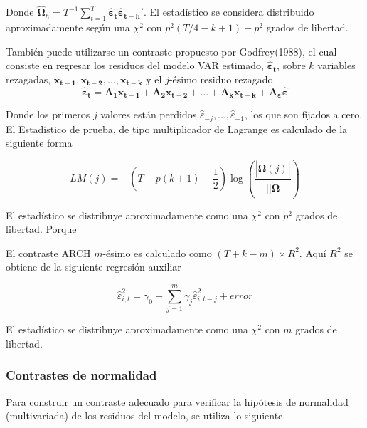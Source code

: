 \documentclass[12pt, twoside]{book}\usepackage[]{graphicx}\usepackage[]{color}
\numberwithin{equation}{section}
\numberwithin{theorem}{section}
\numberwithin{teorema}{section}
\numberwithin{defi}{section}
\numberwithin{prop}{section}
\numberwithin{defi}{section}
\theoremstyle{plain}
\begin{document}
Donde  $ \boldsymbol{\hat{\Omega}}_{h} = T^{-1}\sum_{t=1}^{T}\boldsymbol{\hat{\varepsilon}_{t}\hat{\varepsilon}_{t-h}'}$. El estadístico se considera distribuido aproximadamente según una $\chi^{2}$ con $p^{2}(T/4-k+1)-p^{2}$ grados de libertad. 

También puede utilizarse un contraste propuesto por Godfrey(1988),  el cual consiste en regresar los residuos del modelo VAR estimado, $\boldsymbol{\hat{\varepsilon}_{t}}$, sobre $k$ variables rezagadas, $\mathbf{x_{t-1}, x_{t-2}, ...,x_{t-k}}$ y el $j$-ésimo residuo rezagado
\begin{equation}
\boldsymbol{\hat{\varepsilon}_{t}}=\mathbf{A_{1}x_{t-1}+A_{2}x_{t-2}+...+A_{k}x_{t-k}+A_{\varepsilon}}\boldsymbol{\hat{\varepsilon}}
\end{equation}

Donde los primeros $j$ valores están perdidos $\hat{\varepsilon}_{-j},...,\hat{\varepsilon}_{-1}$, los que son fijados a cero. El Estadístico de prueba, de tipo multiplicador de Lagrange es calculado de la siguiente forma 

\begin{equation}
LM(j) = -(T-p(k+1)-\frac{1}{2})\log \left(\frac{|\boldsymbol{\tilde{\Omega}}(j)|}{||\boldsymbol{\tilde{\Omega}}}\right)
\end{equation}

El estadístico se distribuye aproximadamente como una $\chi^{2}$ con $p^{2}$ grados de libertad. Porque 


El contraste ARCH $m$-ésimo es calculado como $(T+k-m)\times R^{2}$. Aquí $R^{2}$ se obtiene de la siguiente regresión auxiliar

\begin{equation}
\hat{\varepsilon}^{2}_{i,t} = \gamma_{0}+\sum_{j=1}^{m}\gamma_{j}\hat{\varepsilon}_{i,t-j}^{2}+error
\end{equation}

El estadístico se distribuye aproximadamente como una $\chi^{2}$ con $m$ grados de libertad. 

\subsubsection{Contrastes de normalidad}

Para construir un contraste adecuado para verificar la hipótesis de normalidad (multivariada) de los residuos del modelo, se utiliza lo siguiente
\end{document}
